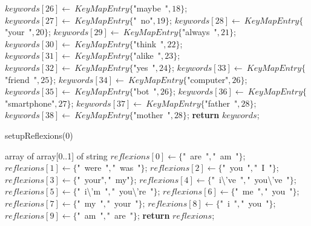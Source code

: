 \documentclass[a4paper,10pt]{article}
\begin{document}
\begin{algorithm}
\begin{algorithmic}[5]
  \State \(keywords[26]\gets\ KeyMapEntry\{\)"{}maybe\ "{}\(,18\}\);
  \State \(keywords[27]\gets\ KeyMapEntry\{\)"{}\ no"{}\(,19\}\);
  \State \(keywords[28]\gets\ KeyMapEntry\{\)"{}your\ "{}\(,20\}\);
  \State \(keywords[29]\gets\ KeyMapEntry\{\)"{}always\ "{}\(,21\}\);
  \State \(keywords[30]\gets\ KeyMapEntry\{\)"{}think\ "{}\(,22\}\);
  \State \(keywords[31]\gets\ KeyMapEntry\{\)"{}alike\ "{}\(,23\}\);
  \State \(keywords[32]\gets\ KeyMapEntry\{\)"{}yes\ "{}\(,24\}\);
  \State \(keywords[33]\gets\ KeyMapEntry\{\)"{}friend\ "{}\(,25\}\);
  \State \(keywords[34]\gets\ KeyMapEntry\{\)"{}computer"{}\(,26\}\);
  \State \(keywords[35]\gets\ KeyMapEntry\{\)"{}bot\ "{}\(,26\}\);
  \State \(keywords[36]\gets\ KeyMapEntry\{\)"{}smartphone"{}\(,27\}\);
  \State \(keywords[37]\gets\ KeyMapEntry\{\)"{}father\ "{}\(,28\}\);
  \State \(keywords[38]\gets\ KeyMapEntry\{\)"{}mother\ "{}\(,28\}\);
  \State \textbf{return} \(keywords\);
\EndFunction
\end{algorithmic}
\end{algorithm}


\begin{algorithm}
\caption{setupReflexions(0)}
\begin{algorithmic}[5]
\State {}
    \State array of array[0..1] of string
  \EndDecl
  \State \(reflexions[0]\gets\{\)"{}\ are\ "{}\(,\)"{}\ am\ "{}\(\}\);
  \State \(reflexions[1]\gets\{\)"{}\ were\ "{}\(,\)"{}\ was\ "{}\(\}\);
  \State \(reflexions[2]\gets\{\)"{}\ you\ "{}\(,\)"{}\ I\ "{}\(\}\);
  \State \(reflexions[3]\gets\{\)"{}\ your"{}\(,\)"{}\ my"{}\(\}\);
  \State \(reflexions[4]\gets\{\)"{}\ i\textbackslash{}'{}ve\ "{}\(,\)"{}\ you\textbackslash{}'{}ve\ "{}\(\}\);
  \State \(reflexions[5]\gets\{\)"{}\ i\textbackslash{}'{}m\ "{}\(,\)"{}\ you\textbackslash{}'{}re\ "{}\(\}\);
  \State \(reflexions[6]\gets\{\)"{}\ me\ "{}\(,\)"{}\ you\ "{}\(\}\);
  \State \(reflexions[7]\gets\{\)"{}\ my\ "{}\(,\)"{}\ your\ "{}\(\}\);
  \State \(reflexions[8]\gets\{\)"{}\ i\ "{}\(,\)"{}\ you\ "{}\(\}\);
  \State \(reflexions[9]\gets\{\)"{}\ am\ "{}\(,\)"{}\ are\ "{}\(\}\);
  \State \textbf{return} \(reflexions\);
\EndFunction
\end{algorithmic}
\end{algorithm}
\end{document}
